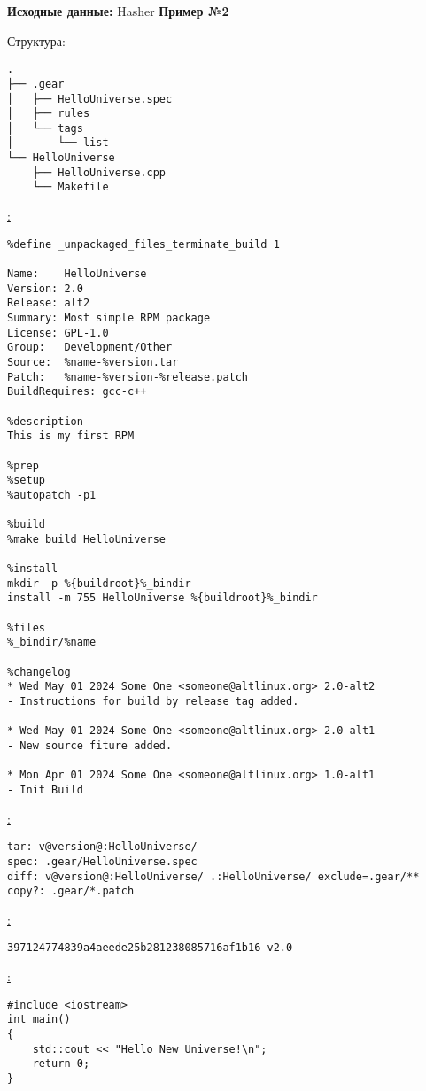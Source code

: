 \textbf{Исходные данные:} Hasher \textbf{Пример №2}

\noindent Структура:
\begin{verbatim}
.
├── .gear
│   ├── HelloUniverse.spec
│   ├── rules
│   └── tags
│       └── list
└── HelloUniverse
    ├── HelloUniverse.cpp
    └── Makefile

\end{verbatim}

\noindent\underline{:}
\begin{verbatim}
%define _unpackaged_files_terminate_build 1

Name:    HelloUniverse
Version: 2.0
Release: alt2
Summary: Most simple RPM package
License: GPL-1.0
Group:   Development/Other
Source:  %name-%version.tar
Patch:   %name-%version-%release.patch
BuildRequires: gcc-c++

%description
This is my first RPM

%prep
%setup
%autopatch -p1

%build
%make_build HelloUniverse

%install
mkdir -p %{buildroot}%_bindir
install -m 755 HelloUniverse %{buildroot}%_bindir

%files
%_bindir/%name

%changelog
* Wed May 01 2024 Some One <someone@altlinux.org> 2.0-alt2
- Instructions for build by release tag added.

* Wed May 01 2024 Some One <someone@altlinux.org> 2.0-alt1
- New source fiture added.

* Mon Apr 01 2024 Some One <someone@altlinux.org> 1.0-alt1
- Init Build

\end{verbatim}

\noindent\underline{:}
\begin{verbatim}
tar: v@version@:HelloUniverse/
spec: .gear/HelloUniverse.spec
diff: v@version@:HelloUniverse/ .:HelloUniverse/ exclude=.gear/**
copy?: .gear/*.patch

\end{verbatim}

\noindent\underline{:}
\begin{verbatim}
397124774839a4aeede25b281238085716af1b16 v2.0

\end{verbatim}

\noindent\underline{:}
\begin{verbatim}
#include <iostream>
int main()
{
    std::cout << "Hello New Universe!\n";
    return 0;
}

\end{verbatim}

